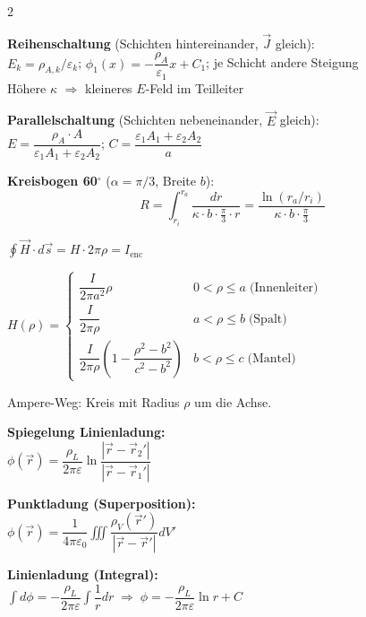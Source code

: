 \documentclass[a4paper, 7.5pt]{extarticle}
\begin{document}
\begin{multicols*}{2}
\begin{tcolorbox}[title={Geschichtete Medien -- Erg\"anzung}, colback=white, colframe=boxtitle]
\textbf{Reihenschaltung} (Schichten hintereinander, $\vec{J}$ gleich):\\
$E_k=\rho_{A,k}/\varepsilon_k$;\; $\phi_1(x)=-\dfrac{\rho_A}{\varepsilon_1}x+C_1$;\; je Schicht andere Steigung\\
H\"ohere $\kappa$ $\Rightarrow$ kleineres $E$-Feld im Teilleiter

\textbf{Parallelschaltung} (Schichten nebeneinander, $\vec{E}$ gleich):\\
$E=\dfrac{\rho_A\cdot A}{\varepsilon_1 A_1+\varepsilon_2 A_2}$;\; $C=\dfrac{\varepsilon_1 A_1+\varepsilon_2 A_2}{a}$

\textbf{Kreisbogen 60$^\circ$} ($\alpha=\pi/3$, Breite $b$):
\[R=\int_{r_i}^{r_a}\frac{dr}{\kappa\cdot b\cdot\frac{\pi}{3}\cdot r}=\frac{\ln(r_a/r_i)}{\kappa\cdot b\cdot\frac{\pi}{3}}\]
\end{tcolorbox}

\begin{tcolorbox}[title={Zylindersymmetrie -- Koaxialkabel (3 Bereiche)}, colback=white, colframe=boxtitle]
$\oint\vec{H}\cdot d\vec{s}=H\cdot2\pi\rho=I_\mathrm{enc}$

$H(\rho)=\begin{cases}
\dfrac{I}{2\pi a^2}\rho & 0<\rho\leq a\;\text{(Innenleiter)}\\[4pt]
\dfrac{I}{2\pi\rho} & a<\rho\leq b\;\text{(Spalt)}\\[4pt]
\dfrac{I}{2\pi\rho}\!\left(1-\dfrac{\rho^2-b^2}{c^2-b^2}\right) & b<\rho\leq c\;\text{(Mantel)}
\end{cases}$

Ampere-Weg: Kreis mit Radius $\rho$ um die Achse.
\end{tcolorbox}

\begin{tcolorbox}[title={Spiegelung Linienladung \& Ladungsformeln}, colback=white, colframe=boxtitle]
\textbf{Spiegelung Linienladung:}\\
$\phi(\vec{r})=\dfrac{\rho_L}{2\pi\varepsilon}\ln\!\dfrac{|\vec{r}-\vec{r}_2'|}{|\vec{r}-\vec{r}_1'|}$

\textbf{Punktladung (Superposition):}\\
$\phi(\vec{r})=\dfrac{1}{4\pi\varepsilon_0}\iiint\dfrac{\rho_V(\vec{r}')}{|\vec{r}-\vec{r}'|}dV'$

\textbf{Linienladung (Integral):}\\
$\int d\phi=-\dfrac{\rho_L}{2\pi\varepsilon}\int\dfrac{1}{r}dr\;\Rightarrow\;\phi=-\dfrac{\rho_L}{2\pi\varepsilon}\ln r+C$
\end{tcolorbox}
\end{multicols*}
\end{document}
